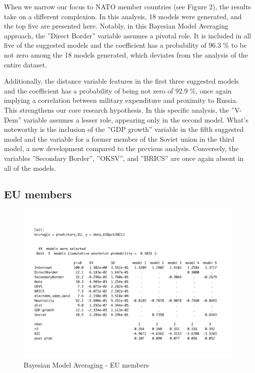 \documentclass[12pt,a4paper]{article}
\begin{document}
When we narrow our focus to NATO member countries (see Figure 2), the results take on a different complexion. In this analysis, 18 models were generated, and the top five are presented here. Notably, in this Bayesian Model Averaging approach, the ''Direct Border'' variable assumes a pivotal role. It is included in all five of the suggested models and the coefficient has a probability of 96.3 \% to be not zero among the 18 models generated, which deviates from the analysis of the entire dataset.

Additionally, the distance variable features in the first three suggested models and the coefficient has a probability of being not zero of 92.9 \%, once again implying a correlation between military expenditure and proximity to Russia. This strengthens our core research hypothesis. In this specific analysis, the ''V-Dem'' variable assumes a lesser role, appearing only in the second model. What's noteworthy is the inclusion of the ''GDP growth'' variable in the fifth suggested model and the variable for a former member of the Soviet union in the third model, a new development compared to the previous analysis. Conversely, the variables ''Secondary Border'', ''OKSV'', and ''BRICS'' are once again absent in all of the models. 


\subsection{EU members}
\begin{figure}[h]
\center
\label{F:1}
\includegraphics[scale=0.5]{BMA_EU}
\caption{Bayesian Model Averaging - EU members}
\end{figure}
\end{document}

